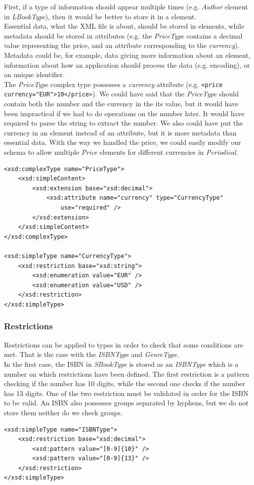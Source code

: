 First, if a type of information should appear multiple times (e.g. \emph{Author}
element in \emph{LBookType}), then it would be better to store it in a element.\\

Essential data, what the XML file is about, should be stored in elements, while
metadata should be stored in attributes (e.g. the \emph{PriceType} contains a
decimal value representing the price, and an attribute corresponding to the
\emph{currency}). Metadata could be, for example, data giving more information
about an element, information about how an
application should process the data (e.g. encoding), or an unique identifier.\\

The \emph{PriceType} complex type possesses a \emph{currency} attribute (e.g.
\verb+<price currency="EUR">10</price>+). We could have said that the
\emph{PriceType} should contain both the number and the currency in the its
value, but it would have been impractical if we had to do operations on the
number later. It would have required to parse the string to extract the number.
We also could have put the currency in an element instead of an attribute, but
it is more metadata than essential data.
With the way we handled the price, we could easily modify our schema to allow
multiple \emph{Price} elements for different currencies in \emph{Periodical}.

\begin{lstlisting}
<xsd:complexType name="PriceType">
    <xsd:simpleContent>
        <xsd:extension base="xsd:decimal">
            <xsd:attribute name="currency" type="CurrencyType"
                use="required" />
        </xsd:extension>
    </xsd:simpleContent>
</xsd:complexType>

<xsd:simpleType name="CurrencyType">
    <xsd:restriction base="xsd:string">
        <xsd:enumeration value="EUR" />
        <xsd:enumeration value="USD" />
    </xsd:restriction>
</xsd:simpleType>
\end{lstlisting}

\subsubsection{Restrictions}

Restrictions can be applied to types in order to check that some conditions
are met. That is the case with the \emph{ISBNType} and \emph{GenreType}.\\

In the first case, the ISBN in \emph{SBookType} is stored as an \emph{ISBNType}
which is a number on which restrictions have been defined. The first restriction
is a pattern checking if the number has 10 digits, while the second one checks
if the number has 13 digits. One of the two restriction must be validated in
order for the ISBN to be valid. An ISBN also possesses groups separated by
hyphens, but we do not store them neither do we check groups.
\begin{lstlisting}
<xsd:simpleType name="ISBNType">
    <xsd:restriction base="xsd:decimal">
        <xsd:pattern value="[0-9]{10}" />
        <xsd:pattern value="[0-9]{13}" />
    </xsd:restriction>
</xsd:simpleType>
\end{lstlisting}
\


